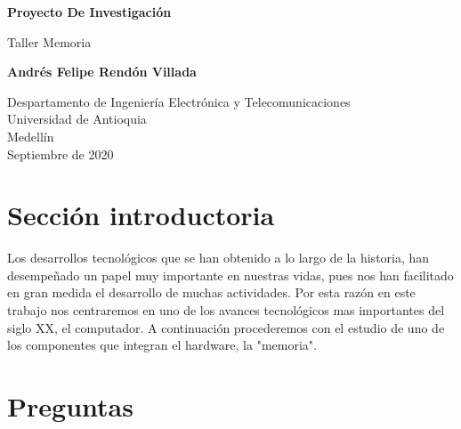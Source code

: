 \documentclass{article}
\begin{document}
\begin{titlepage}
    \begin{center}
        \vspace*{1cm}
            
        \Huge
        \textbf{Proyecto De Investigación}
            
        \vspace{0.5cm}
        \LARGE
        Taller Memoria
            
        \vspace{1.5cm}
            
        \textbf{Andrés Felipe Rendón Villada}
            
        \vfill
            
        \vspace{0.8cm}
            
        \Large
        Despartamento de Ingeniería Electrónica y Telecomunicaciones\\
        Universidad de Antioquia\\
        Medellín\\
        Septiembre de 2020
            
    \end{center}
\end{titlepage}

\tableofcontents

\section{Sección introductoria}
Los desarrollos tecnológicos que se han obtenido a lo largo de la historia, han desempeñado un papel muy importante en nuestras vidas, pues nos han facilitado en gran medida el desarrollo de muchas actividades. Por esta razón en este trabajo nos centraremos en uno de los avances tecnológicos mas importantes del siglo XX, el computador.
\newline
A continuación procederemos con el estudio de uno de los componentes que integran el hardware, la "memoria". 

\section{Preguntas} \label{contenido}
\end{document}
